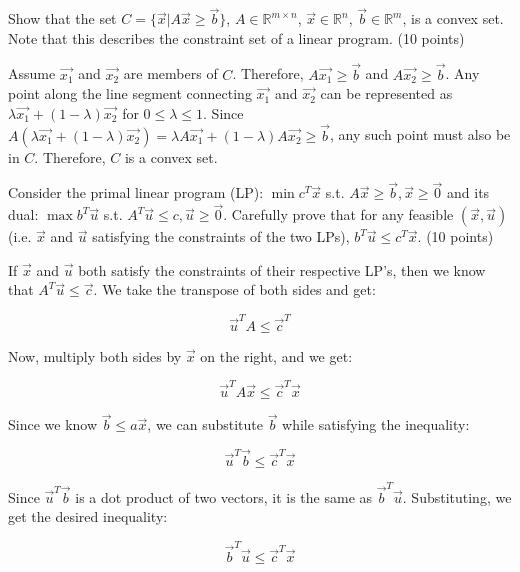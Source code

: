 \documentclass[fleqn]{homework}
\begin{document}
  \begin{problem}{2}
    \begin{question}
      Show that the set $C=\{\vec{x}|A\vec{x} \geq \vec{b}\}$,
      $A \in \mathbb{R}^{m \times n}$, $\vec{x} \in \mathbb{R}^n$,
      $\vec{b} \in \mathbb{R}^m$, is a convex set.  Note that this describes the
      constraint set of a linear program. (10 points)
    \end{question}

    Assume $\vec{x_1}$ and $\vec{x_2}$ are members of $C$.  Therefore,
    $A\vec{x_1} \geq \vec{b}$ and $A\vec{x_2} \geq \vec{b}$.  Any point along
    the line segment connecting $\vec{x_1}$ and $\vec{x_2}$ can be represented
    as $\lambda\vec{x_1} + (1-\lambda)\vec{x_2}$ for $0 \leq \lambda \leq 1$.
    Since
    $A(\lambda\vec{x_1} + (1-\lambda)\vec{x_2}) = \lambda A \vec{x_1} +
    (1-\lambda)A\vec{x_2} \geq \vec{b}$,
    any such point must also be in $C$.  Therefore, $C$ is a convex set.
  \end{problem}

  \begin{problem}{3}
    \begin{question}
      Consider the primal linear program (LP): $\min c^T \vec{x}$ s.t.
      $A\vec{x} \geq \vec{b}, \vec{x} \geq \vec{0}$ and its dual:
      $\max b^T \vec{u}$ s.t. $A^T \vec{u} \leq c, \vec{u} \geq \vec{0}$.
      Carefully prove that for any feasible $(\vec{x},\vec{u})$ (i.e. $\vec{x}$
      and $\vec{u}$ satisfying the constraints of the two LPs),
      $b^T \vec{u} \leq c^T \vec{x}$. (10 points)
    \end{question}

    If $\vec{x}$ and $\vec{u}$ both satisfy the constraints of their respective
    LP's, then we know that $A^T\vec{u} \leq \vec{c}$.  We take the transpose of both
    sides and get:

    \begin{equation*}
      \vec{u}^T A \leq \vec{c}^T
    \end{equation*}

    Now, multiply both sides by $\vec{x}$ on the right, and we get:

    \begin{equation*}
      \vec{u}^T A \vec{x} \leq \vec{c}^T \vec{x}
    \end{equation*}

    Since we know $\vec{b} \leq a \vec{x}$, we can substitute $\vec{b}$ while
    satisfying the inequality:

    \begin{equation*}
      \vec{u}^T \vec{b} \leq \vec{c}^T \vec{x}
    \end{equation*}

    Since $\vec{u}^T \vec{b}$ is a dot product of two vectors, it is the same as
    $\vec{b}^T \vec{u}$.  Substituting, we get the desired inequality:

    \begin{equation*}
      \vec{b}^T \vec{u} \leq \vec{c}^T \vec{x}
    \end{equation*}

  \end{problem}
\end{document}
